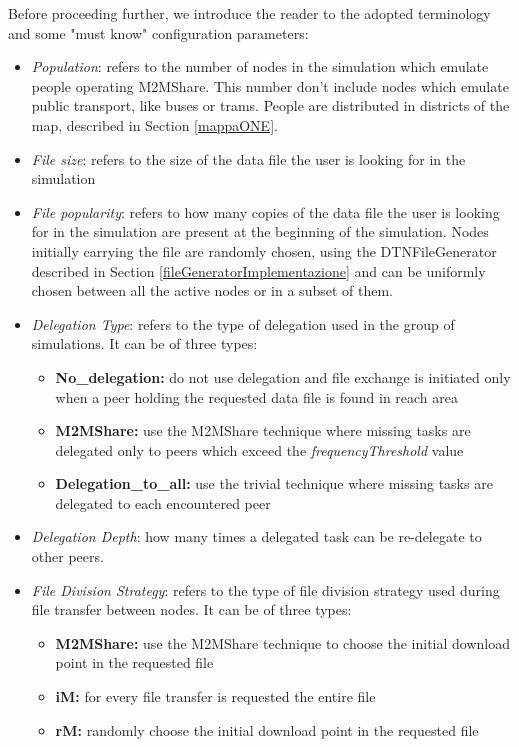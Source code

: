 Before proceeding further, we introduce the reader to the adopted terminology and some "must know" configuration parameters:
\begin{itemize}
\item \textit{Population}: refers to the number of nodes in the simulation which emulate people operating M2MShare. This number don't include nodes which emulate public transport, like buses or trams. People are distributed in districts of the map, described in Section \ref{mappaONE}.

\item \textit{File size}: refers to the size of the data file the user is looking for in the simulation 

\item \textit{File popularity}: refers to how many copies of the data file the user is looking for in the simulation are present at the beginning of the simulation. Nodes initially carrying the file are randomly chosen, using the DTNFileGenerator described in Section \ref{fileGeneratorImplementazione} and can be uniformly chosen between all the active nodes or in a subset of them.

\item \textit{Delegation Type}: refers to the type of delegation used in the group of simulations. It can be of three types:
\begin{itemize}
\item \textbf{No\_delegation:} do not use delegation and file exchange is initiated only when a peer holding the requested data file is found in reach area 
\item \textbf{M2MShare:} use the M2MShare technique where missing tasks are delegated only to peers which exceed the \textit{frequencyThreshold} value
\item \textbf{Delegation\_to\_all:} use the trivial technique where missing tasks are delegated to each encountered peer
\end{itemize}

\item \textit{Delegation Depth}: how many times a delegated task can be re-delegate to other peers.

\item \textit{File Division Strategy}: refers to the type of file division strategy used during file transfer between nodes. It can be of three types:
\begin{itemize}
\item \textbf{M2MShare:} use the M2MShare technique to choose the initial download point in the requested file
\item \textbf{iM:} for every file transfer is requested the entire file
\item \textbf{rM:} randomly choose the initial download point in the requested file
\end{itemize}


\end{itemize}
